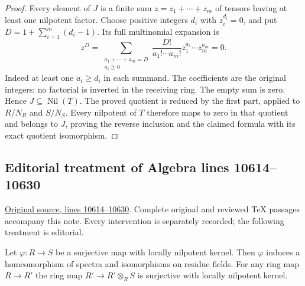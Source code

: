 \begin{proof}
Every element of $J$ is a finite sum
$z=z_1+\cdots+z_m$ of tensors having at
least one nilpotent factor. Choose positive
integers $d_i$ with $z_i^{d_i}=0$, and put
$D=1+\sum_{i=1}^m(d_i-1)$. Its full
multinomial expansion is
$$
z^D=
\sum_{\substack{a_1+\cdots+a_m=D\\a_i\geq0}}
\frac{D!}{a_1!\cdots a_m!}
z_1^{a_1}\cdots z_m^{a_m}=0.
$$
Indeed at least one $a_i\geq d_i$ in each
summand. The coefficients are the original
integers; no factorial is inverted in the
receiving ring. The empty sum is zero.
Hence $J\subseteq\operatorname{Nil}(T)$.
The proved quotient is reduced by the
first part, applied to $R/N_R$ and $S/N_S$.
Every nilpotent of $T$ therefore maps to
zero in that quotient and belongs to $J$,
proving the reverse inclusion and the
claimed formula with its exact quotient
isomorphism.
\end{proof}












\subsection{Editorial treatment of Algebra lines 10614--10630}

\hypertarget{algebra-context-125}{}

\noindent\href{https://github.com/stacks/stacks-project/blob/a04446e57ec1fbc252a871afcec7752fb2807b14/algebra.tex\#L10614}{Original source, lines 10614--10630}. Complete original and reviewed TeX passages accompany this note. Every intervention is separately recorded; the following treatment is editorial.


\begin{lemma}
\label{editorial-source-lemma-surjective-locally-nilpotent-kernel}
Let $\varphi : R \to S$ be a surjective map with locally nilpotent kernel.
Then $\varphi$ induces a homeomorphism of spectra and isomorphisms
on residue fields. For any ring map $R \to R'$ the ring map
$R' \to R' \otimes_R S$ is surjective with locally nilpotent kernel.
\end{lemma}

